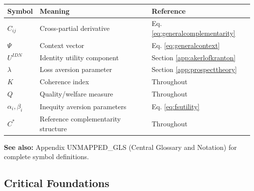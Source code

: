 \begin{center}
\begin{tabular}{@{}lll@{}}
\toprule
\textbf{Symbol} & \textbf{Meaning} & \textbf{Reference} \\
\midrule
$C_{ij}$ & Cross-partial derivative & Eq. \ref{eq:generalcomplementarity} \\
$\Psi$ & Context vector & Eq. \ref{eq:generalcontext} \\
$U^{IDN}$ & Identity utility component & Section \ref{app:akerlofkranton} \\
$\lambda$ & Loss aversion parameter & Section \ref{app:prospecttheory} \\
$K$ & Coherence index & Throughout \\
$Q$ & Quality/welfare measure & Throughout \\
$\alpha_i, \beta_i$ & Inequity aversion parameters & Eq. \ref{eq:fsutility} \\
$C^*$ & Reference complementarity structure & Throughout \\
\bottomrule
\end{tabular}
\end{center}

\textbf{See also:} Appendix UNMAPPED_GLS (Central Glossary and Notation) for complete symbol definitions.


\subsection{Critical Foundations}
\label{sec:A-foundations}

